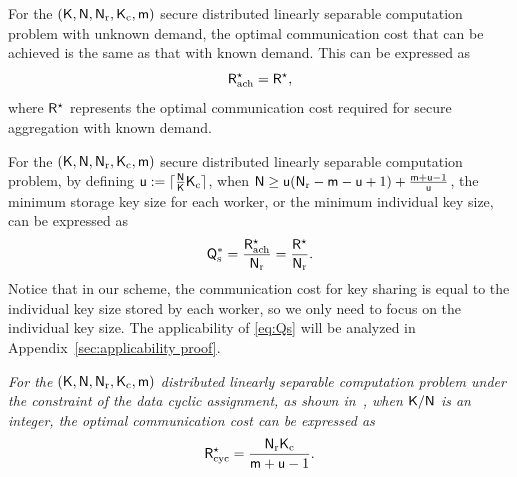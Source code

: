 \documentclass[conference,letterpaper]{IEEEtran}
\begin{document}
\begin{thm}
\label{thm: Communication cost}
For the $({\sf K}, {\sf N}, {\sf N}_{\rm r}, {\sf K}_{\rm c}, {\sf m})$ secure distributed linearly separable computation problem with unknown demand, the optimal communication cost that can be achieved is the same as that with known demand. This can be expressed as
\[
{\sf R}^{\star}_{\text{ach}} = {\sf R}^{\star},
    \label{eq:R*_ach}
\]
where \({\sf R}^{\star}\) represents the optimal communication cost required for secure aggregation with known demand.

\end{thm}



\begin{thm}
\label{thm: Key size}
 For the $({\sf K}, {\sf N}, {\sf N}_{\rm r}, {\sf K}_{\rm c}, {\sf m})$ secure distributed linearly separable computation problem, by defining ${\sf u} := \lceil\frac{{\sf N}}{{\sf K}} {\sf K}_{\rm c}\rceil$, when ${\sf N} \geq {\sf u}({\sf N}_{\rm r}-{\sf m}-{\sf u}+1) + \frac{{\sf m}+{\sf u}-1}{{\sf u}}$,
 the minimum storage key size for each worker, or the minimum individual key size, can be expressed as
\begin{align}
    {\sf Q}^{*}_{\rm s} = \frac{{\sf R}^{\star}_{\text{ach}}}{{\sf N}_{\rm r}} = \frac{{\sf R}^{\star}}{{\sf N}_{\rm r}}.
    \label{eq:Qs}
\end{align}
 Notice that in our scheme, the communication cost for key sharing is equal to the individual key size stored by each worker, so we only need to focus on the individual key size.
The applicability of \eqref{eq:Qs} will be analyzed in Appendix~\ref{sec:applicability proof}.
\end{thm}

\begin{rem}
\label{rem:the minimum communication cost}
\em
For the $({\sf K}, {\sf N}, {\sf N}_{\rm r}, {\sf K}_{\rm c}, {\sf m})$ distributed linearly separable computation problem under the constraint of the data cyclic assignment, as shown in~\cite[Theorem 4]{limit}, when \( {\sf K} / {\sf N} \) is an integer, the optimal communication cost can be expressed as
\begin{equation}
{\sf R}^{\star}_{\text{cyc}} = \frac{{\sf N}_{\rm r} {\sf K}_{\rm c}}{{\sf m} + {\sf u} - 1}.
\end{equation}


\end{rem}
\end{document}
